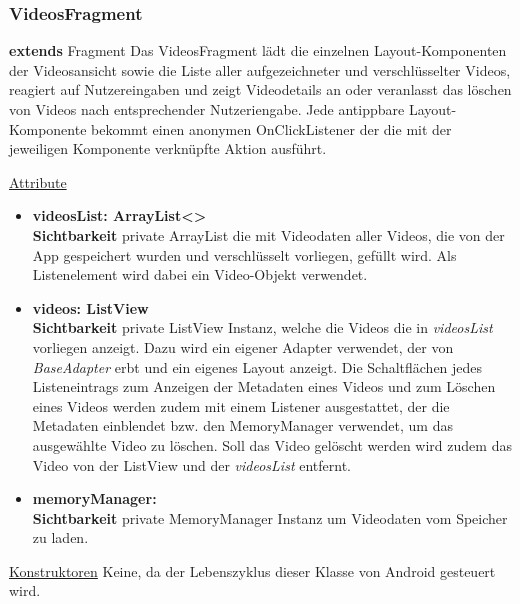 \subsubsection{VideosFragment} \label{app:klasse:VideosFragment}
\textbf{extends} Fragment \newline
Das VideosFragment lädt die einzelnen Layout-Komponenten der Videosansicht sowie die Liste aller aufgezeichneter und verschlüsselter Videos, reagiert auf Nutzereingaben und zeigt Videodetails an oder veranlasst das löschen von Videos nach entsprechender Nutzeriengabe. Jede antippbare Layout-Komponente bekommt einen anonymen OnClickListener der die mit der jeweiligen Komponente verknüpfte Aktion ausführt.
\newline

\underline{Attribute}
\begin{itemize}
\itemsep0pt
\item \textbf{videosList: ArrayList<> } \hfill\\ 
\textbf{Sichtbarkeit} private \newline
ArrayList die mit Videodaten aller Videos, die von der App gespeichert wurden und verschlüsselt vorliegen, gefüllt wird. Als Listenelement wird dabei ein Video-Objekt verwendet.

\item \textbf{videos: ListView} \hfill\\ 
\textbf{Sichtbarkeit} private \newline
ListView Instanz, welche die Videos die in \textit{videosList} vorliegen anzeigt. Dazu wird ein eigener Adapter verwendet, der von \textit{BaseAdapter} erbt und ein eigenes Layout anzeigt. Die Schaltflächen jedes Listeneintrags zum Anzeigen der Metadaten eines Videos und zum Löschen eines Videos werden zudem mit einem Listener ausgestattet, der die Metadaten einblendet bzw. den MemoryManager verwendet, um das ausgewählte Video zu löschen. Soll das Video gelöscht werden wird zudem das Video von der ListView und der \textit{videosList} entfernt.

\item \textbf{memoryManager: } \hfill\\ 
\textbf{Sichtbarkeit} private \newline
MemoryManager Instanz um Videodaten vom Speicher zu laden.

\end{itemize}

\underline{Konstruktoren}\newline
\indent Keine, da der Lebenszyklus dieser Klasse von Android gesteuert wird.\newline

